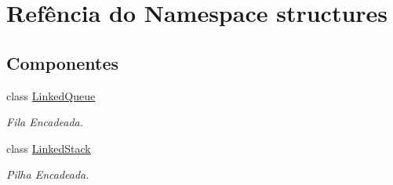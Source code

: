 \hypertarget{namespacestructures}{}\section{Refência do Namespace structures}
\label{namespacestructures}
\subsection*{Componentes}
\begin{DoxyCompactItemize}
\item 
class \mbox{\hyperlink{classstructures_1_1_linked_queue}{Linked\+Queue}}
\begin{DoxyCompactList}\small\item\em Fila Encadeada. \end{DoxyCompactList}\item 
class \mbox{\hyperlink{classstructures_1_1_linked_stack}{Linked\+Stack}}
\begin{DoxyCompactList}\small\item\em Pilha Encadeada. \end{DoxyCompactList}\end{DoxyCompactItemize}
